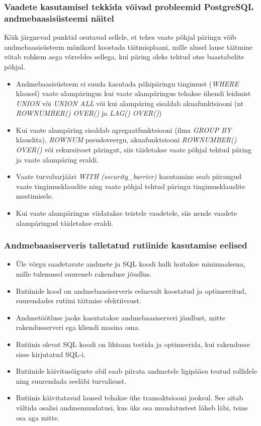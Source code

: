 \documentclass[a4paper,12pt]{article} %
\begin{document}
\subsubsection{Vaadete kasutamisel tekkida võivad probleemid PostgreSQL andmebaasisüsteemi näitel}
Kõik järgnevad punktid osutavad sellele, et tehes vaate põhjal päringu võib andmebaasisüsteem mõnikord koostada täitmisplaani, mille alusel lause täitmine võtab rohkem aega võrreldes sellega, kui päring oleks tehtud otse baastabelite põhjal.
\begin{itemize}
\item Andmebaasisüsteem ei suuda kasutada põhipäringu tingimust (\textit{WHERE} klausel) vaate alampäringus kui vaate alampäringus tehakse ühendi leidmist \textit{UNION} või \textit{UNION ALL} või kui alampäring sisaldab aknafunktsiooni (nt \textit{ROWNUMBER() OVER()} ja \textit{LAG() OVER()})
\item Kui vaate alampäring sisaldab agregaatfunktsiooni (ilma \textit{GROUP BY} klauslita), \textit{ROWNUM} pseudoveergu, aknafunktsiooni \textit{ROWNUMBER() OVER()} või rekursiivset päringut, siis täidetakse vaate põhjal tehtud päring ja vaate alampäring eraldi.
\item Vaate turvabarjääri \textit{WITH (security\_barrier)} kasutamine seab piirangud vaate tingimusklauslite ning vaate põhjal tehtud päringu tingimusklauslite mestimisele.
\item Kui vaate alampäringus viidatakse teistele vaadetele, siis nende vaadete alampäringud täidetakse eraldi.
\end{itemize}
\cite[lk 101-102]{VaadeteMojuParingutele}

\subsubsection{Andmebaasiserveris talletatud rutiinide kasutamise eelised}
\begin{itemize}
\item Üle võrgu saadetavate andmete ja SQL koodi hulk hoitakse minimaalsena, mille tulemusel suureneb rakenduse jõudlus.
\item Rutiinide kood on andmebaasiserveris eelnevalt koostatud ja optimeeritud, suurendades rutiini täitmise efektiivsust.
\item Andmetöötluse jaoks kasutatakse andmebaasiserveri jõudlust, mitte rakendusserveri ega kliendi masina oma.
\item Rutiinis olevat SQL koodi on lihtsam testida ja optimeerida, kui rakendusse sisse kirjutatud SQL-i.
\item Rutiinide käivitusõiguste abil saab piirata andmetele ligipääsu teatud rollidele ning suurendada seeläbi turvalisust.
\item Rutiinis käivitatavad laused tehakse ühe transaktsiooni jooksul. See aitab vältida osalisi andmemuudatusi, kus üks osa muudatustest läheb läbi, teine osa aga mitte.
\end{itemize}
\cite[lk 179, 195]{BuildingTheAgileDatabase}
\end{document}
